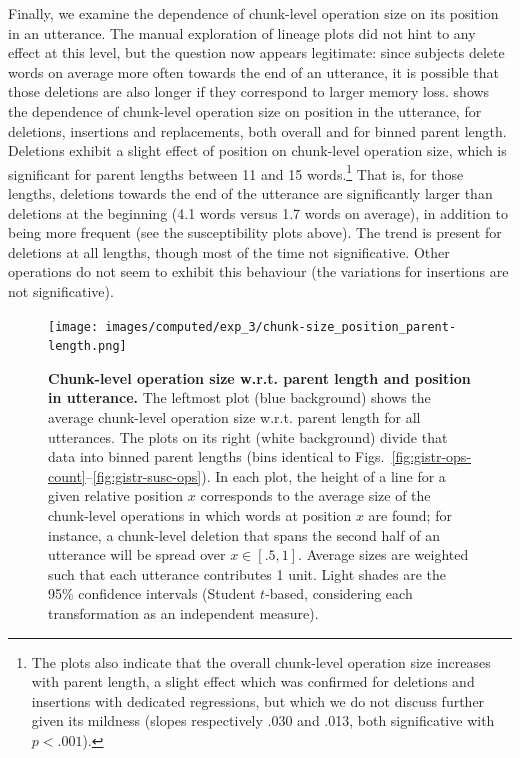 Finally, we examine the dependence of chunk-level operation size on its
position in an utterance. The manual exploration of lineage plots did
not hint to any effect at this level, but the question now appears
legitimate: since subjects delete words on average more often towards
the end of an utterance, it is possible that those deletions are also
longer if they correspond to larger memory loss.
 shows the dependence of chunk-level
operation size on position in the utterance, for deletions, insertions
and replacements, both overall and for binned parent length. Deletions
exhibit a slight effect of position on chunk-level operation size, which
is significant for parent lengths between 11 and 15 words.\footnote{The
  plots also indicate that the overall chunk-level operation size
  increases with parent length, a slight effect which was confirmed for
  deletions and insertions with dedicated regressions, but which we do
  not discuss further given its mildness (slopes respectively .030 and
  .013, both significative with \(p < .001\)).} That is, for those
lengths, deletions towards the end of the utterance are significantly
larger than deletions at the beginning (4.1 words versus 1.7 words on
average), in addition to being more frequent (see the susceptibility
plots above). The trend is present for deletions at all lengths, though
most of the time not significative. Other operations do not seem to
exhibit this behaviour (the variations for insertions are not
significative).

\begin{figure}[!ht]
  \centering
  \texttt{[image: images/computed/exp\_3/chunk-size\_position\_parent-length.png]}
  \caption[Chunk-level operation size w.r.t. parent length and position in utterance]{
  \textbf{Chunk-level operation size w.r.t. parent length and position in utterance.}
  The leftmost plot (blue background) shows the average chunk-level operation size w.r.t. parent length for all utterances.
  The plots on its right (white background) divide that data into binned parent lengths (bins identical to Figs.~\ref{fig:gistr-ops-count}--\ref{fig:gistr-susc-ops}).
  In each plot, the height of a line for a given relative position $x$ corresponds to the average size of the chunk-level operations in which words at position $x$ are found;
  for instance, a chunk-level deletion that spans the second half of an utterance will be spread over $x \in [.5, 1]$.
  Average sizes are weighted such that each utterance contributes 1 unit.
  Light shades are the 95\% confidence intervals (Student $t$-based, considering each transformation as an independent measure).
  }
  \label{fig:gistr-chunk-size}
\end{figure}

